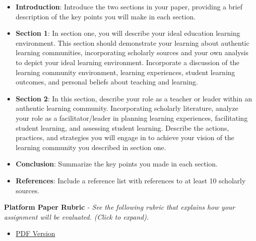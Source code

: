 \documentclass[
]{book}
\providecommand{\tightlist}{%
  \setlength{\itemsep}{0pt}\setlength{\parskip}{0pt}}
\begin{document}
\begin{assessment}
\begin{itemize}
\tightlist
\item
  \textbf{Introduction}: Introduce the two sections in your paper,
  providing a brief description of the key points you will make in each
  section.\\
\item
  \textbf{Section 1}: In section one, you will describe your ideal
  education learning environment. This section should demonstrate your
  learning about authentic learning communities, incorporating scholarly
  sources and your own analysis to depict your ideal learning
  environment. Incorporate a discussion of the learning community
  environment, learning experiences, student learning outcomes, and
  personal beliefs about teaching and learning.\\
\item
  \textbf{Section 2}: In this section, describe your role as a teacher
  or leader within an authentic learning community. Incorporating
  scholarly literature, analyze your role as a facilitator/leader in
  planning learning experiences, facilitating student learning, and
  assessing student learning. Describe the actions, practices, and
  strategies you will engage in to achieve your vision of the learning
  community you described in section one.\\
\item
  \textbf{Conclusion}: Summarize the key points you made in each
  section.\\
\item
  \textbf{References}: Include a reference list with references to at
  least 10 scholarly sources.
\end{itemize}
\end{assessment}

\textbf{Platform Paper Rubric} \emph{- See the following rubric that explains how your assignment will be evaluated. (Click to expand).}

\begin{itemize}
\tightlist
\item
  \href{assets/assessment/Platform-Paper-RUBRIC.pdf}{PDF Version}
\end{itemize}
\end{document}
